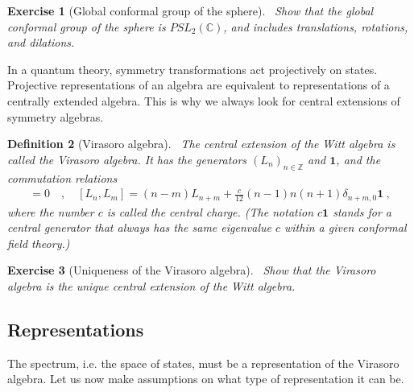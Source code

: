 \documentclass[12pt, a4paper]{article}
\theoremstyle{break}
\newtheorem{exo}{Exercise}[section]
\newtheorem{defn}[exo]{Definition}
\begin{document}


\begin{exo}[Global conformal group of the sphere]
 ~\label{exo:sphere}
Show that the global conformal group of the sphere is $PSL_2(\mathbb{C})$, and includes translations, rotations, and dilations. 
\end{exo}

In a quantum theory, symmetry transformations act projectively on states. 
Projective representations of an algebra are equivalent to representations of a centrally extended algebra. 
This is why we always look for central extensions of symmetry algebras.

\begin{defn}[Virasoro algebra]
 ~\label{def:vir}
 The central extension of the Witt algebra is called the Virasoro algebra. It has the generators $(L_n)_{n\in\mathbb{Z}}$ and $\mathbf 1$, and the commutation relations
 \begin{align}
  [\mathbf 1, L_n] = 0 \quad , \quad [L_n,L_m] = (n-m)L_{n+m} +\frac{c}{12}(n-1)n(n+1)\delta_{n+m,0}\mathbf 1 \ ,
  \label{eq:vir}
 \end{align}
 where the number $c$ is called the central charge. (The notation $c\mathbf 1$ stands for a central generator that always has the same eigenvalue $c$ within a given conformal field theory.)
\end{defn}

\begin{exo}[Uniqueness of the Virasoro algebra]
 ~\label{exo:vir}
 Show that the Virasoro algebra is the unique central extension of the Witt algebra.
\end{exo}


\subsection{Representations}

The spectrum, i.e. the space of states, must be a representation of the Virasoro algebra. Let us now make assumptions on what type of representation it can be.
\end{document}
